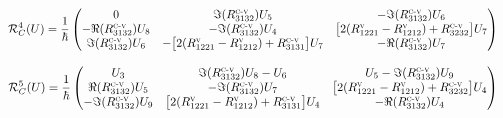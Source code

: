 \documentclass[a4paper,12pt]{article} %
\begin{document}
\begin{small}
\begin{eqnarray*}
\begin{split}
\mathcal{R}^{4}_{C}(U)&= \dfrac{1}{\hbar}
\begin{pmatrix}
0 & \Im(R^{\textsc{c-v}}_{3132})U_{5} & -\Im(R^{\textsc{c-v}}_{3132})U_{6} \\
-\Re(R^{\textsc{c-v}}_{3132})U_{8} & -\Im(R^{\textsc{c-v}}_{3132})U_{4} & \big[2(R^{\textsc{v}}_{1221}-R^{\textsc{v}}_{1212})+R^{\textsc{c-v}}_{3232}\big]U_{7}\\
\Im(R^{\textsc{c-v}}_{3132})U_{6} & -\big[2(R^{\textsc{v}}_{1221}-R^{\textsc{v}}_{1212})+R^{\textsc{c-v}}_{3131}\big]U_{7} & -\Re(R^{\textsc{c-v}}_{3132})U_{7}
\end{pmatrix}
\end{split}
\end{eqnarray*}


\begin{eqnarray*}
\begin{split}
\mathcal{R}^{5}_{C}(U)&= \dfrac{1}{\hbar}
\begin{pmatrix}
U_{3} & \Im(R^{\textsc{c-v}}_{3132})U_{8}-U_{6} & U_{5}-\Im(R^{\textsc{c-v}}_{3132})U_{9} \\
\Re(R^{\textsc{c-v}}_{3132})U_{5} & -\Im(R^{\textsc{c-v}}_{3132})U_{7} & \big[2(R^{\textsc{v}}_{1221}-R^{\textsc{v}}_{1212})+R^{\textsc{c-v}}_{3232}\big]U_{4}\\
-\Im(R^{\textsc{c-v}}_{3132})U_{9} & \big[2(R^{\textsc{v}}_{1221}-R^{\textsc{v}}_{1212})+R^{\textsc{c-v}}_{3131}\big]U_{4} & -\Re(R^{\textsc{c-v}}_{3132})U_{4}
\end{pmatrix}
\end{split}
\end{eqnarray*}
\end{small}
\end{document}
